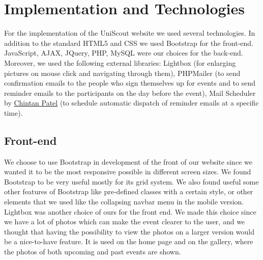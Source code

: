 \documentclass[a4paper]{article}
\begin{document}
	\section{Implementation and Technologies}
	For the implementation of the UniScout website we used several technologies. In addition to the standard HTML5 and CSS we used Bootstrap for the front-end. JavaScript, AJAX, JQuery, PHP, MySQL were our choices for the back-end.\\
	Moreover, we used the following external libraries: Lightbox (for enlarging pictures on mouse click and navigating through them), PHPMailer (to send confirmation emails to the people who sign themselves up for events and to send reminder emails to the participants on the day before the event), Mail Scheduler by \href{https://chynten.wordpress.com/2016/06/03/java-scheduler-to-run-every-day-on-specific-time/}{Chintan Patel} (to schedule automatic dispatch of reminder emails at a specific time).
	
	\subsection{Front-end}
	We choose to use Bootstrap in development of the front of our website since we wanted it to be the most responsive possible in different screen sizes. We found Bootstrap to be very useful mostly for its grid system. We also found useful some other features of Bootstrap like pre-defined classes with a certain style, or other elements that we used like the collapsing navbar menu in the mobile version.\\
	Lightbox was another choice of ours for the front end. We made this choice since we have a lot of photos which can make the event clearer to the user, and we thought that having the possibility to view the photos on a larger version would be a nice-to-have feature. It is used on the home page and on the gallery, where the photos of both upcoming and past events are shown.
\end{document}
